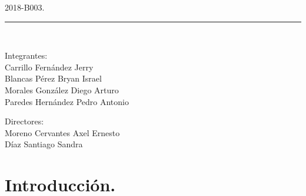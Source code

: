 \documentclass[12pt, a4paper, titlepage]{article}
\begin{document}
\begin{titlepage}
\begin{center}
			\begin{large}
				2018-B003.\\
			\end{large}
			
			\vspace*{0.2in}
			
			\rule{80mm}{.1mm}\\
			\vspace*{0.1in}
			
			\begin{large}
				\begin{center}
					Integrantes:\\
					Carrillo Fernández Jerry\\
					Blancas Pérez Bryan Israel\\
					Morales González Diego Arturo\\
					Paredes Hernández Pedro Antonio\\
				\end{center}
			\end{large}
			
			\begin{large}
				Directores:\\
				Moreno Cervantes Axel Ernesto\\
				Díaz Santiago Sandra\\
			\end{large}
			
		\end{center}
	
	\end{titlepage}

	\begin{appendix}
		\href{}{\renewcommand*\contentsname{{\textcolor{azulescom}{Índice.}}}}
		\tableofcontents
		\newpage
		\renewcommand*\listfigurename{{\textcolor{azulescom}{Índice de figuras.}}}
		\listoffigures
		\newpage
		\newpage
		\renewcommand*\listtablename{{\textcolor{azulescom}{Índice de cuadros.}}}
		\listoftables
	\end{appendix}
	\newpage
	

	\section{\textcolor{azulescom}{Introducción.}}
\end{document}
